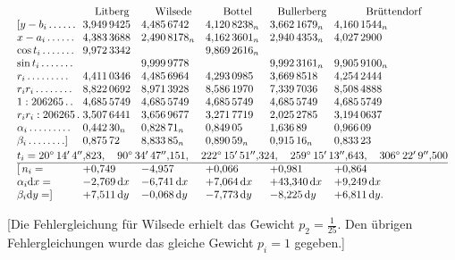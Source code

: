 \[
\resizebox{\linewidth}{!}{\(\begin{array}{@{}l@{\;}l@{\quad}l@{\quad}l@{\quad}l@{\quad}l@{}}
 &\multicolumn{1}{c}{\text{Litberg}}
 &\multicolumn{1}{c}{\text{Wilsede}}
 &\multicolumn{1}{c}{\text{Bottel}}
 &\multicolumn{1}{c}{\text{Bullerberg}}
 &\multicolumn{1}{c@{}}{\text{Brüttendorf}}\\
 {[}y-b_i\,.\,.\,.\,.\,.\,.&3{,}949\,9425&4{,}485\,6742&4{,}120\,8238_{n}&3{,}662\,1679_{n}&4{,}160\,1544_{n}\\
 x-a_i\,.\,.\,.\,.\,.\,.&4{,}383\,3688&2{,}490\,8178_{n}&4{,}162\,3601_{n}&2{,}940\,4353_{n}&4{,}027\,2900\\
 \cos t_i\,.\,.\,.\,.\,.\,.\,.&9{,}972\,3342&&9{,}869\,2616_{n}&&\\
 \sin t_i\,.\,.\,.\,.\,.\,.\,.&&9{,}999\,9778&&9{,}992\,3161_{n}&9{,}905\,9100_{n}\\
 r_i\,.\,.\,.\,.\,.\,.\,.\,.\,.&4{,}411\,0346&4{,}485\,6964&4{,}293\,0985&3{,}669\,8518&4{,}254\,2444\\
 r_ir_i\,.\,.\,.\,.\,.\,.\,.\,.&8{,}822\,0692&8{,}971\,3928&8{,}586\,1970&7{,}339\,7036&8{,}508\,4888\\
 1:206265\,.\,.&4{,}685\,5749&4{,}685\,5749&4{,}685\,5749&4{,}685\,5749&4{,}685\,5749\\
 r_ir_i:206265\,.&3{,}507\,6441&3{,}656\,9677&3{,}271\,7719&2{,}025\,2785&3{,}194\,0637\\
 \alpha_i\,.\,.\,.\,.\,.\,.\,.\,.\,.&0{,}442\,30_{n}&0{,}828\,71_{n}&0{,}849\,05&1{,}636\,89&0{,}966\,09\\
 \beta_i\,.\,.\,.\,.\,.\,.\,.\,.]&0{,}875\,72&8{,}833\,85_{n}&0{,}890\,59_{n}&0{,}915\,16_{n}&0{,}833\,23
\\[2pt]
 \multicolumn{6}{@{}l@{}}{t_i=20^\circ\,14'\,4''{,}823,\quad
 90^\circ\,34'\,47''{,}151,\quad222^\circ\,15'\,51''{,}324,\quad
 259^\circ\,15'\,13''{,}643,\quad306^\circ\,22'\,9''{,}500}\\
 \hline
 [\,n_i=&+0{,}749&-4{,}957&+0{,}066&+0{,}981&+0{,}864\\
 \alpha_i\mathrm{d}x=&-2{,}769\,\mathrm{d}x&-6{,}741\,\mathrm{d}x&+7{,}064\,\mathrm{d}x&+43{,}340\,\mathrm{d}x&+9{,}249\,\mathrm{d}x\\
 \beta_i\mathrm{d}y=]&+7{,}511\,\mathrm{d}y&-0{,}068\,\mathrm{d}y&-7{,}773\,\mathrm{d}y&-8{,}225\,\mathrm{d}y&+6{,}811\,\mathrm{d}y.
\end{array}\)}
\]

[Die Fehlergleichung für Wilsede erhielt das Gewicht \(p_2=\tfrac1{25}\). Den übrigen Fehlergleichungen wurde das gleiche Gewicht \(p_i=1\) gegeben.]

